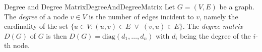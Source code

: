 \begin{mdef}{Degree and Degree Matrix}{DegreeAndDegreeMatrix}
    Let $G=(V,E)$ be a graph. The \emph{degree} of a node $v\in V$ is the number of edges incident to $v$, namely the cardinality of the set $\{u\in V: (u,v)\in E\;\lor\;(v,u)\in E\}$. The \emph{degree matrix} $D(G)$ of $G$ is then $D(G) = \text{diag}(d_1,\ldots,d_n)$ with $d_i$ being the degree of the $i$-th node.
\end{mdef}